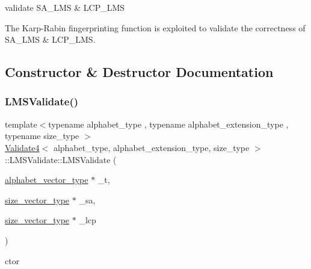 validate S\+A\+\_\+\+L\+MS \& L\+C\+P\+\_\+\+L\+MS 

The Karp-\/\+Rabin fingerprinting function is exploited to validate the correctness of S\+A\+\_\+\+L\+MS \& L\+C\+P\+\_\+\+L\+MS. 

\subsection{Constructor \& Destructor Documentation}
\mbox{\label{struct_validate4_1_1_l_m_s_validate_a93810bf60dc23710fb678ae863aaebec}} 
\subsubsection{\texorpdfstring{L\+M\+S\+Validate()}{LMSValidate()}}
{\footnotesize\ttfamily template$<$typename alphabet\+\_\+type , typename alphabet\+\_\+extension\+\_\+type , typename size\+\_\+type $>$ \\
\hyperlink{class_validate4}{Validate4}$<$ alphabet\+\_\+type, alphabet\+\_\+extension\+\_\+type, size\+\_\+type $>$\+::L\+M\+S\+Validate\+::\+L\+M\+S\+Validate (\begin{DoxyParamCaption}\item[{\hyperlink{class_validate4_a49c80b3d101be19542a4341c2387603a}{alphabet\+\_\+vector\+\_\+type} $\ast$}]{\+\_\+t,  }\item[{\hyperlink{class_validate4_a46ea31a0a4b23f583806792160421d15}{size\+\_\+vector\+\_\+type} $\ast$}]{\+\_\+sa,  }\item[{\hyperlink{class_validate4_a46ea31a0a4b23f583806792160421d15}{size\+\_\+vector\+\_\+type} $\ast$}]{\+\_\+lcp }\end{DoxyParamCaption})\hspace{0.3cm}{\ttfamily [inline]}}



ctor 

\mbox{\label{struct_validate4_1_1_l_m_s_validate_adaf3ee4e530f37787e9ff8c9f2ac511b}} 
